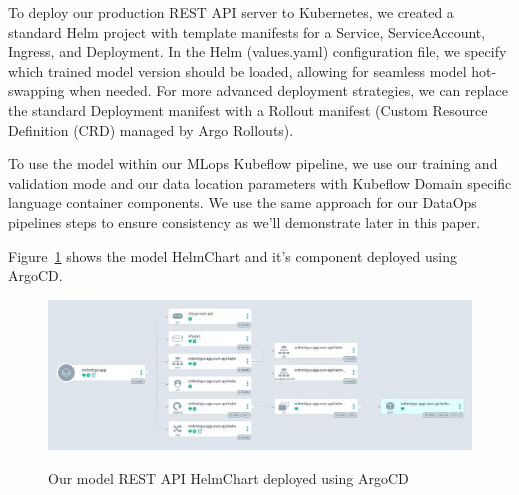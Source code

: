 To deploy our production REST API server to Kubernetes, we created a standard Helm project with template manifests for a Service,
ServiceAccount, Ingress, and Deployment.
In the Helm (values.yaml) configuration file, we specify which trained model version should be loaded, allowing for seamless model hot-swapping when needed.
For more advanced deployment strategies, we can replace the standard Deployment manifest with a Rollout manifest (Custom Resource Definition (CRD) managed by Argo Rollouts).

To use the model within our MLops Kubeflow pipeline, we use our training and validation mode and our data location parameters with Kubeflow Domain specific language container components.
We use the same approach for our DataOps pipelines steps to ensure consistency as we'll demonstrate later in this paper.

Figure~\ref{fig:model-api} shows the model HelmChart and it's component deployed using ArgoCD\@.

\begin{figure}[!htbp]
    \centering
    \caption{Our model REST API HelmChart deployed using ArgoCD}
    \includegraphics[width=\textwidth]{images/project/argocd-model-api}
    \label{fig:model-api}
\end{figure}
